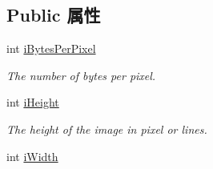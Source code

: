 \subsection*{Public 属性}
\begin{DoxyCompactItemize}
\item 
\hypertarget{struct_image_buffer_ab3a5f0c0ce093491638a7c10dda8c14c}{int \hyperlink{struct_image_buffer_ab3a5f0c0ce093491638a7c10dda8c14c}{i\+Bytes\+Per\+Pixel}}\label{struct_image_buffer_ab3a5f0c0ce093491638a7c10dda8c14c}

\begin{DoxyCompactList}\small\item\em The number of bytes per pixel. \end{DoxyCompactList}\item 
\hypertarget{struct_image_buffer_a590ae28b8676c88979d0216d8f4e10bf}{int \hyperlink{struct_image_buffer_a590ae28b8676c88979d0216d8f4e10bf}{i\+Height}}\label{struct_image_buffer_a590ae28b8676c88979d0216d8f4e10bf}

\begin{DoxyCompactList}\small\item\em The height of the image in pixel or lines. \end{DoxyCompactList}\item 
\hypertarget{struct_image_buffer_ab86c2341c91142138f674108543c2851}{int \hyperlink{struct_image_buffer_ab86c2341c91142138f674108543c2851}{i\+Width}}\label{struct_image_buffer_ab86c2341c91142138f674108543c2851}


\end{DoxyCompactItemize}
